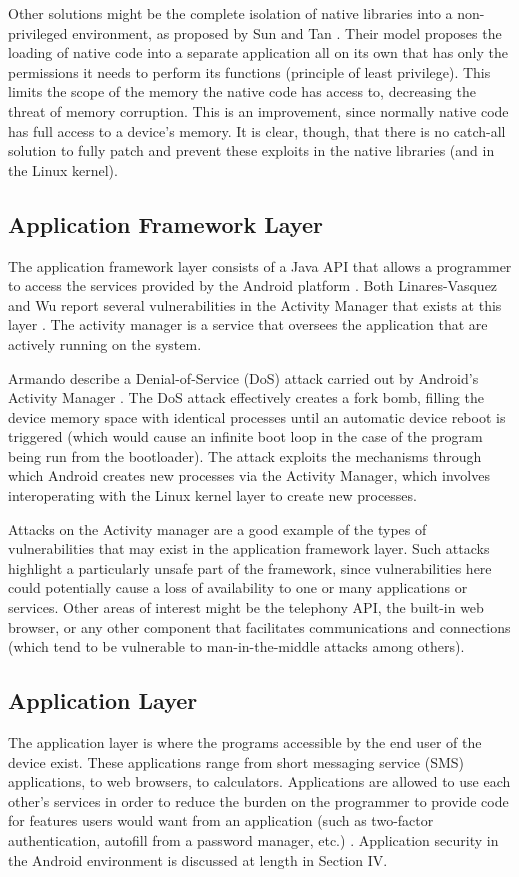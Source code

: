 Other solutions might be the complete isolation of native libraries into a non-privileged environment, as proposed by Sun and Tan \cite{Sun2014}.
Their model proposes the loading of native code into a separate application all on its own that has only the permissions it needs to perform its functions (principle of least privilege).
This limits the scope of the memory the native code has access to, decreasing the threat of memory corruption.
This is an improvement, since normally native code has full access to a device's memory.
It is clear, though, that there is no catch-all solution to fully patch and prevent these exploits in the native libraries (and in the Linux kernel).

\subsection{Application Framework Layer}
The application framework layer consists of a Java API that allows a programmer to access the services provided by the Android platform \cite{AndroidDocs2022Arch}.
Both Linares-Vasquez \etal and Wu \etal report several vulnerabilities in the Activity Manager that exists at this layer \cite{LinaresVasquez2017, Wu2019}.
The activity manager is a service that oversees the application that are actively running on the system.

Armando \etal describe a Denial-of-Service (DoS) attack carried out by Android's Activity Manager \cite{Armando2012}.
The DoS attack effectively creates a fork bomb, filling the device memory space with identical processes until an automatic device reboot is triggered (which would cause an infinite boot loop in the case of the program being run from the bootloader).
The attack exploits the mechanisms through which Android creates new processes via the Activity Manager, which involves interoperating with the Linux kernel layer to create new processes.

Attacks on the Activity manager are a good example of the types of vulnerabilities that may exist in the application framework layer.
Such attacks highlight a particularly unsafe part of the framework, since vulnerabilities here could potentially cause a loss of availability to one or many applications or services.
Other areas of interest might be the telephony API, the built-in web browser, or any other component that facilitates communications and connections (which tend to be vulnerable to man-in-the-middle attacks among others).

\subsection{Application Layer}
The application layer is where the programs accessible by the end user of the device exist.
These applications range from short messaging service (SMS) applications, to web browsers, to calculators.
Applications are allowed to use each other's services in order to reduce the burden on the programmer to provide code for features users would want from an application (such as two-factor authentication, autofill from a password manager, etc.) \cite{AndroidDocs2022Arch}.
Application security in the Android environment is discussed at length in Section IV.
